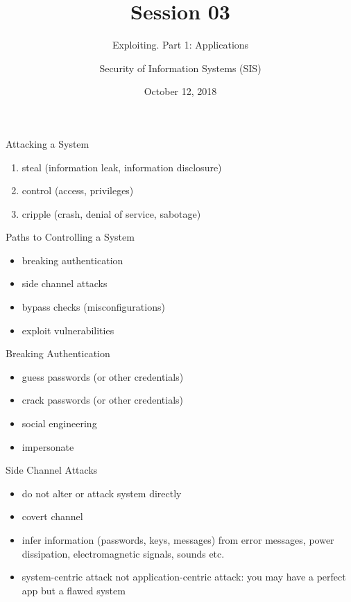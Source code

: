\documentclass{curs}
\title[Session 03]{Session 03}
\subtitle{Exploiting. Part 1: Applications}
\author{Security of Information Systems (SIS)}
\date{October 12, 2018}
\begin{document}
\frame{\titlepage}

\begin{frame}{Attacking a System}
  \begin{enumerate}
    \pause \item steal (information leak, information disclosure)
    \pause \item control (access, privileges)
    \pause \item cripple (crash, denial of service, sabotage)
  \end{enumerate}
\end{frame}

\begin{frame}{Paths to Controlling a System}
  \begin{itemize}
    \pause \item breaking authentication
    \pause \item side channel attacks
    \pause \item bypass checks (misconfigurations)
    \pause \item exploit vulnerabilities
  \end{itemize}
\end{frame}

\begin{frame}{Breaking Authentication}
  \begin{itemize}
    \pause \item guess passwords (or other credentials)
    \pause \item crack passwords (or other credentials)
    \pause \item social engineering
    \pause \item impersonate
  \end{itemize}
\end{frame}

\begin{frame}{Side Channel Attacks}
  \begin{itemize}
    \pause \item do not alter or attack system directly
    \pause \item covert channel
    \pause \item infer information (passwords, keys, messages) from error messages, power dissipation, electromagnetic signals, sounds etc.
    \pause \item system-centric attack not application-centric attack: you may have a perfect app but a flawed system
  \end{itemize}
\end{frame}
\end{document}

